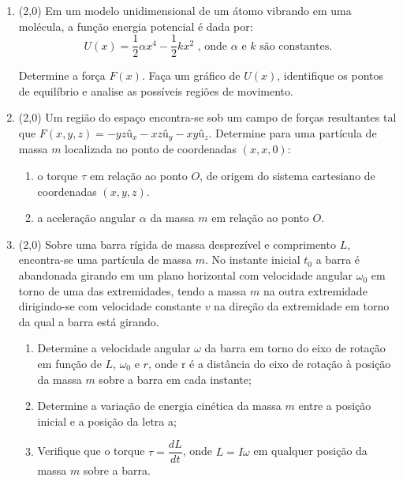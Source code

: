 \documentclass[12pt,a4paper]{article}
\begin{document}
\begin{enumerate}
\item (2,0) Em um modelo unidimensional de um átomo vibrando em uma molécula, a função energia potencial é dada por:
$$U(x)=\dfrac{1}{2}\alpha x^4-\dfrac{1}{2}kx^2\textrm{ , onde } \alpha \textrm{ e } k \textrm{ são constantes.}$$

Determine a força $F(x)$. Faça um gráfico de $U(x)$, identifique os pontos de equilíbrio e analise as possíveis regiões de movimento.

\item (2,0) Um região do espaço encontra-se sob um campo de forças resultantes tal que $F(x,y,z)=-yz \textrm{û}_x - xz \textrm{û}_y - xy \textrm{û}_z$. Determine
para uma partícula de massa $m$ localizada no ponto de coordenadas $(x,x,0)$:

\begin{enumerate}[label=\alph*)]
\item o torque $\tau$ em relação ao ponto $O$, de origem do sistema cartesiano de coordenadas $(x,y,z)$.
\item a aceleração angular $\alpha$ da massa $m$ em relação ao ponto $O$.
\end{enumerate}

\item (2,0) Sobre uma barra rígida de massa desprezível e comprimento $L$, encontra-se uma partícula de massa $m$. No instante inicial $t_0$ a barra é abandonada
girando em um plano horizontal com velocidade angular $\omega_0$ em torno de uma das extremidades, tendo a massa $m$ na outra extremidade dirigindo-se com velocidade constante
$v$ na direção da extremidade em torno da qual a barra está girando.

\begin{enumerate}[label=\alph*)]
\item Determine a velocidade angular $\omega$ da barra em torno do eixo de rotação em função de $L$, $\omega_0$ e $r$, onde 
r é a distância do eixo de rotação à posição da massa $m$ sobre a barra em cada instante;
\item Determine a variação de energia cinética da massa $m$ entre a posição inicial e a posição da letra a;
\item Verifique que o torque $\tau=\dfrac{dL}{dt}$, onde $L=I\omega$ em qualquer posição da massa $m$ sobre a barra.
\end{enumerate}

\end{enumerate}

\newpage
\end{document}
